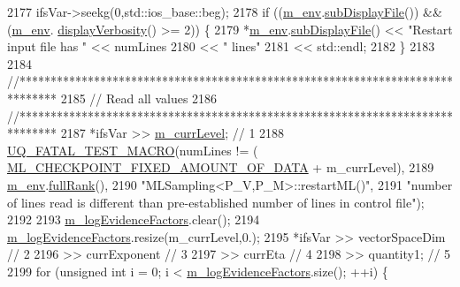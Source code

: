 \begin{DoxyCode}
2177     ifsVar->seekg(0,std::ios\_base::beg);
2178     \textcolor{keywordflow}{if} ((\hyperlink{class_q_u_e_s_o_1_1_m_l_sampling_a13f1ca4fe9f94822fe572a743eaced1d}{m\_env}.\hyperlink{class_q_u_e_s_o_1_1_base_environment_a8a0064746ae8dddfece4229b9ad374d6}{subDisplayFile}()) && (\hyperlink{class_q_u_e_s_o_1_1_m_l_sampling_a13f1ca4fe9f94822fe572a743eaced1d}{m\_env}.
      \hyperlink{class_q_u_e_s_o_1_1_base_environment_a1fe5f244fc0316a0ab3e37463f108b96}{displayVerbosity}() >= 2)) \{
2179       *\hyperlink{class_q_u_e_s_o_1_1_m_l_sampling_a13f1ca4fe9f94822fe572a743eaced1d}{m\_env}.\hyperlink{class_q_u_e_s_o_1_1_base_environment_a8a0064746ae8dddfece4229b9ad374d6}{subDisplayFile}() << \textcolor{stringliteral}{"Restart input file has "} << numLines
2180                               << \textcolor{stringliteral}{" lines"}
2181                               << std::endl;
2182     \}
2183 
2184     \textcolor{comment}{//******************************************************************************}
2185     \textcolor{comment}{// Read all values}
2186     \textcolor{comment}{//******************************************************************************}
2187     *ifsVar >> \hyperlink{class_q_u_e_s_o_1_1_m_l_sampling_af9416874c856e50f3b35270e801f17e4}{m\_currLevel}; \textcolor{comment}{// 1}
2188     \hyperlink{_defines_8h_a56d63d18d0a6d45757de47fcc06f574d}{UQ\_FATAL\_TEST\_MACRO}(numLines != (
      \hyperlink{_m_l_sampling_8h_a6c830698381e4aa1c55b3b418754ae4b}{ML\_CHECKPOINT\_FIXED\_AMOUNT\_OF\_DATA} + m\_currLevel),
2189                         \hyperlink{class_q_u_e_s_o_1_1_m_l_sampling_a13f1ca4fe9f94822fe572a743eaced1d}{m\_env}.\hyperlink{class_q_u_e_s_o_1_1_base_environment_a84a239e42ae443cf71db6e03e8159620}{fullRank}(),
2190                         \textcolor{stringliteral}{"MLSampling<P\_V,P\_M>::restartML()"},
2191                         \textcolor{stringliteral}{"number of lines read is different than pre-established number of lines in control
       file"});
2192 
2193     \hyperlink{class_q_u_e_s_o_1_1_m_l_sampling_a75f2ceab4a2c6774b3fa07d74221dbf3}{m\_logEvidenceFactors}.clear();
2194     \hyperlink{class_q_u_e_s_o_1_1_m_l_sampling_a75f2ceab4a2c6774b3fa07d74221dbf3}{m\_logEvidenceFactors}.resize(m\_currLevel,0.);
2195     *ifsVar >> vectorSpaceDim  \textcolor{comment}{// 2}
2196             >> currExponent    \textcolor{comment}{// 3}
2197             >> currEta         \textcolor{comment}{// 4}
2198             >> quantity1;      \textcolor{comment}{// 5}
2199     \textcolor{keywordflow}{for} (\textcolor{keywordtype}{unsigned} \textcolor{keywordtype}{int} i = 0; i < \hyperlink{class_q_u_e_s_o_1_1_m_l_sampling_a75f2ceab4a2c6774b3fa07d74221dbf3}{m\_logEvidenceFactors}.size(); ++i) \{

\end{DoxyCode}
